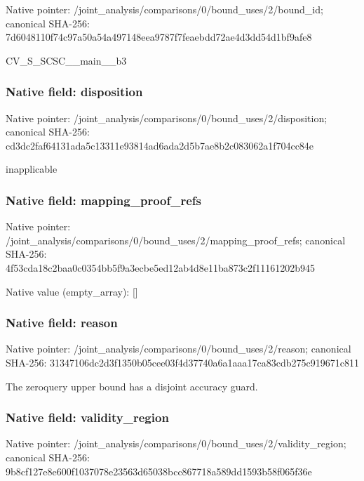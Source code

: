 \documentclass[10pt,a4paper]{article}
\begin{document}
Native pointer: /joint\_analysis/comparis\allowbreak{}ons/0/bound\_uses/2/bound\allowbreak{}\_id; canonical SHA-256: 7d6048110f74c97a50a54a49\allowbreak{}7148eea9787f7feaebdd72ae\allowbreak{}4d3dd54d1bf9afe8


CV\_S\_SCSC\_\_main\_\_b3


\subsubsection{Native field: disposition}


Native pointer: /joint\_analysis/comparis\allowbreak{}ons/0/bound\_uses/2/dispo\allowbreak{}sition; canonical SHA-256: cd3dc2faf64131ada5c13311\allowbreak{}e93814ad6ada2d5b7ae8b2c0\allowbreak{}83062a1f704cc84e


inapplicable


\subsubsection{Native field: mapping\_proof\_refs}


Native pointer: /joint\_analysis/comparis\allowbreak{}ons/0/bound\_uses/2/mappi\allowbreak{}ng\_proof\_refs; canonical SHA-256: 4f53cda18c2baa0c0354bb5f\allowbreak{}9a3ecbe5ed12ab4d8e11ba87\allowbreak{}3c2f11161202b945



Native value (empty\_array): []



\subsubsection{Native field: reason}


Native pointer: /joint\_analysis/comparis\allowbreak{}ons/0/bound\_uses/2/reaso\allowbreak{}n; canonical SHA-256: 31347106dc2d3f1350b05cee\allowbreak{}03f4d37740a6a1aaa17ca83c\allowbreak{}db275c919671c811


The zeroquery upper bound has a disjoint accuracy guard.


\subsubsection{Native field: validity\_region}


Native pointer: /joint\_analysis/comparis\allowbreak{}ons/0/bound\_uses/2/valid\allowbreak{}ity\_region; canonical SHA-256: 9b8cf127e8e600f1037078e2\allowbreak{}3563d65038bcc867718a589d\allowbreak{}d1593b58f065f36e
\end{document}
